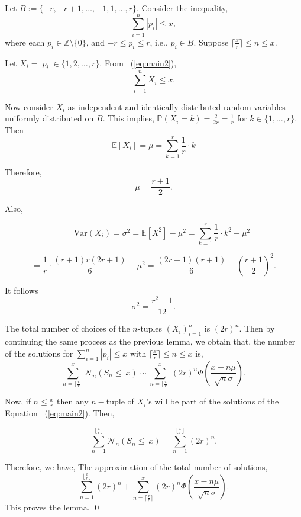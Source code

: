 \documentclass[10pt,a4paper]{amsart}
\newcommand{\eqnref}[1]{~{\textrm(\ref{#1})}}
\renewenvironment{proof}{{\bfseries Proof.}}{\qed}
\begin{document}
	 \begin{proof} 	
	 	Let $B:=\{-r,-r+1,\dots,-1,1,\dots,r\}$. 	Consider the inequality,
	 	\begin{equation} \label{eq:main2}
	 		\sum_{i=1}^{n} |p_i| \leq x,
	 	\end{equation}
	 	where each \( p_i \in \mathbb{Z} \setminus \{0\} \), and \( -r \leq p_i \leq r \), i.e., \( p_i \in B \). Suppose $\lceil\frac{x}{r}\rceil \leq n\leq x. $
	 	
	 	Let \( X_i = |p_i| \in \{1, 2, \dots, r\} \). From \eqnref{eq:main2}, 
	 	\[
	 	\sum_{i=1}^n X_i \leq x.
	 	\]
	 	
	 	Now consider \( X_i \) as independent and identically distributed random variables uniformly distributed on \(B \). This implies,  $\mathbb{P}(X_{i}=k)=\frac{2}{2r}=\frac{1}{r}$ for $k\in \{1,\dots,r\}$. Then
	 	\[
	 	\mathbb{E}[X_i] = \mu = \sum_{k=1}^{r} \frac{1}{r}\cdot k 
	 	\]
	 
	 	Therefore,	\[{\mu=\frac{r+1}{2}}.\]
	 	
	 	
	 	
	 	
	 	Also,
	 	
	 	\[ \qquad \mathrm{Var}(X_i) = \sigma^2 = \mathbb{E}[X^{2}]-\mu^{2}=\sum_{k=1}^{r} \frac{1}{r}\cdot k^{2} -\mu^{2}\]
	 	
	 	\[
	 	= \frac{1}{r} \cdot \frac{(r+1)r(2r + 1)}{6}  -\mu^{2}= \frac{(2r+ 1)(r+1)}{6} -\left( \frac{r+1}{2} \right)^2.
	 	\]
	 	

    It follows 	 	\[
	 	{
	 		\sigma^{2}=\frac{r^{2}-1}{12}.
	 	}
	 	\]
	 	
	 	
	 The total number of choices of the $n$-tuples  $(X_i)_{i=1}^{n}$ is $(2r)^{n}.$ Then
	 	by continuing the same process as the previous lemma, we obtain that, 
	 	 	the number of the solutions for $\sum_{i=1}^{n}|p_{i}|\leq x$ with $\lceil \frac{x}{r}\rceil\leq n\leq x$ is,
	 	\[ {\sum_{n=\lceil \frac{x}{r}\rceil}^{x}\mathcal{N}_{n}(S_n \leq ~x)}\sim{\sum_{n=\lceil \frac{x}{r}\rceil}^{x}(2r)^{n}\Phi\left(\frac{x-n\mu}{\sqrt{n}\sigma}\right)}. \]
	 	
	 	Now, if $n\leq \frac{x}{r}$ then any $n-$tuple of $X_{i}$'s will be part of the solutions of the Equation \eqnref{eq:main2}. Then,
	 	
	 	\[{\sum_{n=1}^{\lfloor \frac{x}{r}\rfloor}\mathcal{N}_{n}(S_n \leq ~x)}=\sum_{n=1}^{\lfloor \frac{x}{r}\rfloor}(2r)^{n}.\]
	 	
	 	Therefore, we have,
	 	The approximation of the total number of solutions,
	 	\[\sum_{n=1}^{\lfloor \frac{x}{r}\rfloor}(2r)^{n}+{\sum_{n=\lceil \frac{x}{r}\rceil}^{x}(2r)^{n}\Phi\left(\frac{x-n\mu}{\sqrt{n}\sigma}\right)} .\]
        This proves the lemma. 
	 \end{proof}
\end{document}
